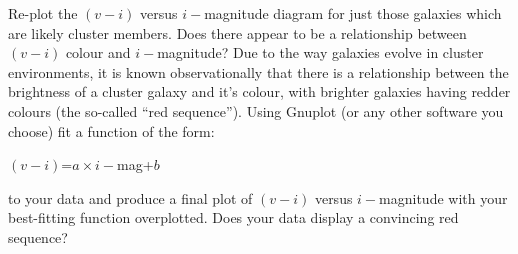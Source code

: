Re-plot the $(v-i)$ versus $i-$magnitude diagram for just those galaxies which are likely cluster members. Does there appear to be a relationship between $(v-i)$ colour and $i-$magnitude? Due to the way galaxies evolve in cluster environments, it is known observationally that there is a relationship between the brightness of a cluster galaxy and it's colour, with brighter galaxies having redder colours (the so-called ``red sequence''). Using Gnuplot (or any other software you choose) fit a function of the form:\\
\begin{center}
$(v-i)$=$a\times i-$mag+$b$ 
\end{center}
\noindent
to your data and produce a final plot of $(v-i)$ versus $i-$magnitude with your best-fitting function overplotted. Does your data display a convincing red sequence?
